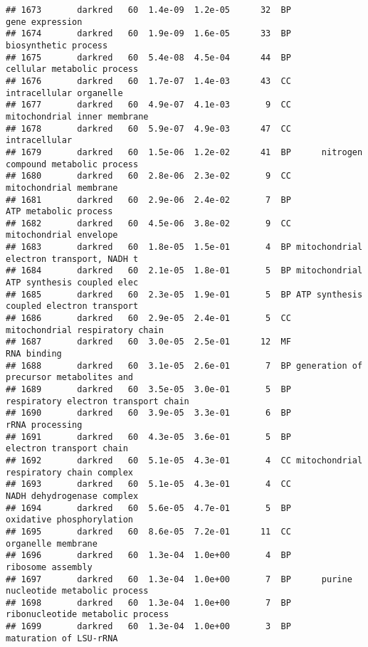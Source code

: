 \documentclass[]{article}
\begin{document}
\begin{verbatim}
## 1673       darkred   60  1.4e-09  1.2e-05      32  BP                          gene expression
## 1674       darkred   60  1.9e-09  1.6e-05      33  BP                     biosynthetic process
## 1675       darkred   60  5.4e-08  4.5e-04      44  BP               cellular metabolic process
## 1676       darkred   60  1.7e-07  1.4e-03      43  CC                  intracellular organelle
## 1677       darkred   60  4.9e-07  4.1e-03       9  CC             mitochondrial inner membrane
## 1678       darkred   60  5.9e-07  4.9e-03      47  CC                            intracellular
## 1679       darkred   60  1.5e-06  1.2e-02      41  BP      nitrogen compound metabolic process
## 1680       darkred   60  2.8e-06  2.3e-02       9  CC                   mitochondrial membrane
## 1681       darkred   60  2.9e-06  2.4e-02       7  BP                    ATP metabolic process
## 1682       darkred   60  4.5e-06  3.8e-02       9  CC                   mitochondrial envelope
## 1683       darkred   60  1.8e-05  1.5e-01       4  BP mitochondrial electron transport, NADH t
## 1684       darkred   60  2.1e-05  1.8e-01       5  BP mitochondrial ATP synthesis coupled elec
## 1685       darkred   60  2.3e-05  1.9e-01       5  BP ATP synthesis coupled electron transport
## 1686       darkred   60  2.9e-05  2.4e-01       5  CC          mitochondrial respiratory chain
## 1687       darkred   60  3.0e-05  2.5e-01      12  MF                              RNA binding
## 1688       darkred   60  3.1e-05  2.6e-01       7  BP generation of precursor metabolites and 
## 1689       darkred   60  3.5e-05  3.0e-01       5  BP     respiratory electron transport chain
## 1690       darkred   60  3.9e-05  3.3e-01       6  BP                          rRNA processing
## 1691       darkred   60  4.3e-05  3.6e-01       5  BP                 electron transport chain
## 1692       darkred   60  5.1e-05  4.3e-01       4  CC mitochondrial respiratory chain complex 
## 1693       darkred   60  5.1e-05  4.3e-01       4  CC               NADH dehydrogenase complex
## 1694       darkred   60  5.6e-05  4.7e-01       5  BP                oxidative phosphorylation
## 1695       darkred   60  8.6e-05  7.2e-01      11  CC                       organelle membrane
## 1696       darkred   60  1.3e-04  1.0e+00       4  BP                        ribosome assembly
## 1697       darkred   60  1.3e-04  1.0e+00       7  BP      purine nucleotide metabolic process
## 1698       darkred   60  1.3e-04  1.0e+00       7  BP         ribonucleotide metabolic process
## 1699       darkred   60  1.3e-04  1.0e+00       3  BP                   maturation of LSU-rRNA

\end{verbatim}
\end{document}
